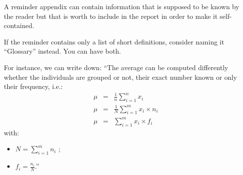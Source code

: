 \label{app:Reminder}

A reminder appendix can contain information that is supposed to be known by the reader but that is worth to include in the report in order to make it self-contained.

If the reminder contains only a list of short definitions, consider naming it ``Glossary'' instead.  You can have both.

For instance, we can write down: ``The average can be computed differently whether the individuals are grouped or not, their exact number known or only their frequency, i.e.:
\begin{eqnarray}
    \mu & = & \frac{1}{n} \sum_{i=1}^n x_i\\
    \mu & = & \frac{1}{N} \sum_{i=1}^m x_i \times n_i\\
    \mu & = & \sum_{i=1}^m x_i \times f_i
\end{eqnarray}
with:
\begin{itemize}
    \item $N = \sum_{i=1}^m n_i$ ;
    \item $f_i = \frac{n_i}{N}$.''
\end{itemize}
